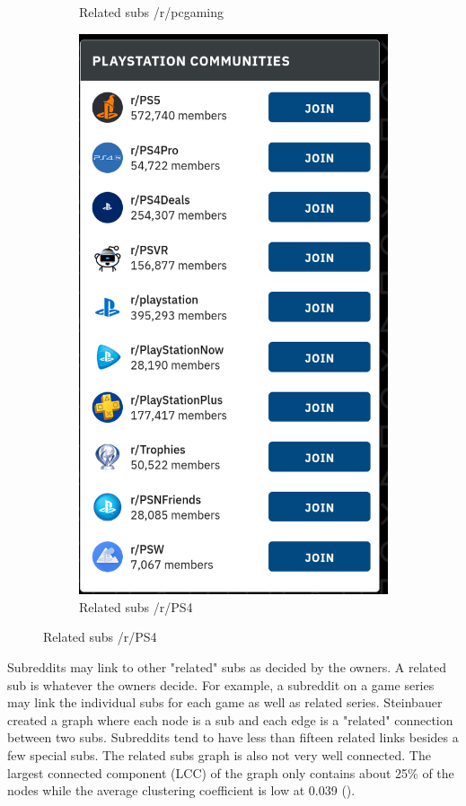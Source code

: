 \documentclass[12pt, a4paper]{article}
\begin{document}
\begin{figure}[ht!]
\begin{subfigure}[b]{0.4\linewidth}
    \caption{Related subs /r/pcgaming}
  \end{subfigure}
  \begin{subfigure}[b]{0.4\linewidth}
    \includegraphics[width=\linewidth]{related_ps4.png}
    \caption{Related subs /r/PS4}
  \end{subfigure}
\end{figure}

Subreddits may link to other "related" subs as decided by the owners. A related sub is whatever the owners decide. For example, a subreddit on a game series may link the individual subs for each game as well as related series. Steinbauer created a graph where each node is a sub and each edge is a "related" connection between two subs. Subreddits tend to have less than fifteen related links besides a few special subs. The related subs graph is also not very well connected. The largest connected component (LCC) of the graph only contains about 25\% of the nodes while the average clustering coefficient is low at 0.039 (\cite{tbower_2011}). 
\end{document}

